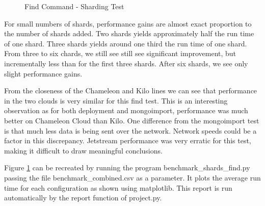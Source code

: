 \documentclass[9pt,twocolumn,twoside]{../../styles/osajnl}
\begin{document}
\begin{figure}[htbp]
\centering
{}
\caption{Find Command - Sharding Test}
\label{fig:shard-find}
\end{figure}


For small numbers of shards, performance gains are almost exact proportion to the number of shards added.  Two shards yields approximately half the run time of one shard.  Three shards yields around one third the run time of one shard.  From three to six chards, we still see still see significant improvement, but incrementally less than for the first three shards.  After six shards, we see only slight performance gains.

From the closeness of the Chameleon and Kilo lines we can see that performance in the two clouds is very similar for this find test.  This is an interesting observation as for both deployment and mongoimport, performance was much better on Chameleon Cloud than Kilo.  One difference from the mongoimport test is that much less data is being sent over the network.  Network speeds could be a factor in this discrepancy.  Jetstream performance was very erratic for this test, making it difficult to draw meaningful conclusions.

Figure \ref{fig:shard-find} can be recreated by running the program benchmark\_shards\_find.py passing the file benchmark\_combined.csv as a parameter.  It plots the average run time for each configuration as shown using matplotlib.  This report is run automatically by the report function of project.py.
\end{document}
